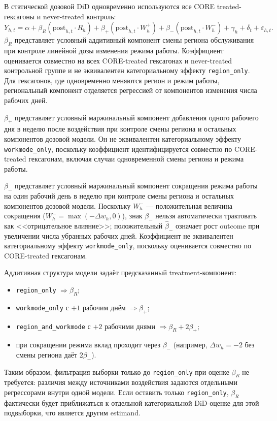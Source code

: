 \documentclass[14pt,a4paper]{extarticle}
\begin{document}
В статической дозовой DiD одновременно используются все CORE treated-гексагоны и
never-treated контроль:
\[
Y_{h,t}
=
\alpha
+
\beta_R(\mathrm{post}_{h,t}\cdot R_h)
+
\beta_+(\mathrm{post}_{h,t}\cdot W_h^+)
+
\beta_-(\mathrm{post}_{h,t}\cdot W_h^-)
+
\gamma_h
+
\delta_t
+
\varepsilon_{h,t}.
\]
\(\beta_R\) представляет условный аддитивный компонент смены региона обслуживания
при контроле линейной дозы изменения режима работы. Коэффициент оценивается
совместно на всех CORE-treated гексагонах и never-treated контрольной группе и
не эквивалентен категориальному эффекту \texttt{region\_only}. Для гексагонов,
где одновременно меняются регион и режим работы, региональный компонент
отделяется регрессией от компонентов изменения числа рабочих дней.

\(\beta_+\) представляет условный маржинальный компонент добавления одного
рабочего дня в неделю после воздействия при контроле смены региона и остальных
компонентов дозовой модели. Он не эквивалентен категориальному эффекту
\texttt{workmode\_only}, поскольку коэффициент идентифицируется совместно по
CORE-treated гексагонам, включая случаи одновременной смены региона и режима
работы.

\(\beta_-\) представляет условный маржинальный компонент сокращения режима
работы на один рабочий день в неделю при контроле смены региона и остальных
компонентов дозовой модели. Поскольку \(W_h^-\) --- положительная величина
сокращения (\(W_h^-=\max(-\Delta w_h,0)\)), знак \(\beta_-\) нельзя
автоматически трактовать как <<отрицательное влияние>>; положительный
\(\hat\beta_-\) означает рост outcome при увеличении числа убранных рабочих дней.
Коэффициент не эквивалентен категориальному эффекту \texttt{workmode\_only},
поскольку оценивается совместно по CORE-treated гексагонам.

Аддитивная структура модели задаёт предсказанный treatment-компонент:
\begin{itemize}
  \item \texttt{region\_only} $\Rightarrow \beta_R$;
  \item \texttt{workmode\_only} с $+1$ рабочим днём $\Rightarrow \beta_+$;
  \item \texttt{region\_and\_workmode} с $+2$ рабочими днями
        $\Rightarrow \beta_R+2\beta_+$;
  \item при сокращении режима вклад проходит через $\beta_-$
        (например, $\Delta w_h=-2$ без смены региона даёт $2\beta_-$).
\end{itemize}
Таким образом, фильтрация выборки только до \texttt{region\_only} при оценке
\(\beta_R\) не требуется: различия между источниками воздействия задаются
отдельными регрессорами внутри одной модели. Если оставить только
\texttt{region\_only}, \(\beta_R\) фактически будет приближаться к отдельной
категориальной DiD-оценке для этой подвыборки, что является другим estimand.
\end{document}
